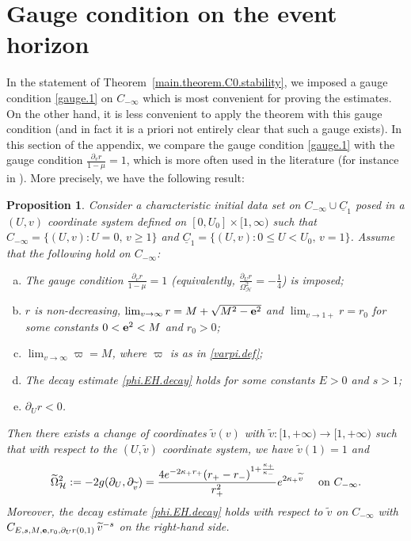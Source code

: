 \documentclass[10pt, reqno]{amsart}
\newtheorem{proposition}[theorem]{Proposition}
\theoremstyle{definition}
\theoremstyle{remark}
\numberwithin{equation}{section}
\newcommand{\set}[1]{\{#1\}}
\newcommand{\rd}{\partial}
\newcommand{\0}{\emptyset}
\newcommand{\Omg}{\Omega}
\newcommand{\bfe}{{\bf e}}
\newcommand{\f}{\frac}
\newcommand{\e}{\bfe}							%
\begin{document}
\section{Gauge condition on the event horizon}\label{sec:appendix.gauge}
In the statement of Theorem~\ref{main.theorem.C0.stability}, we imposed a gauge condition \eqref{gauge.1} on $C_{-\infty}$ which is most convenient for proving the estimates. On the other hand, it is less convenient to apply the theorem with this gauge condition (and in fact it is a priori not entirely clear that such a gauge exists). In this section of the appendix, we compare the gauge condition \eqref{gauge.1} with the gauge condition $\f{\rd_v r}{1-\mu}=1$, which is more often used in the literature (for instance in \cite{DRPL}). More precisely, we have the following result:

\begin{proposition} \label{prop:gauge}
Consider a characteristic initial data set on $C_{-\infty} \cup \underline{C}_{1}$ posed in a $(U,v)$ coordinate system defined on $[0, U_{0}] \times [1, \infty)$ such that $C_{-\infty}= \set{(U, v) : U = 0, \, v \geq 1}$ and $\underline{C}_{1} = \set{(U, v) : 0 \leq U < U_{0}, \, v = 1}$. Assume that the following hold on $C_{-\infty}$:
\begin{enumerate}[(a)]
\item The gauge condition $\f{\rd_v r}{1-\mu}=1$ (equivalently, $\f{\rd_U r}{\Omg^2_{\mathcal H}}=-\f 14$) is imposed;
\item $r$ is non-decreasing, $\lim_{v \to \infty} r = M +\sqrt{M^2-{\bf e}^2}$ and $\lim_{v \to 1+} r = r_{0}$ for some constants $0 < \e^{2} < M$ and $r_{0} > 0$;
\item $\lim_{v \to \infty} \varpi = M$, where $\varpi$ is as in \eqref{varpi.def};
\item The decay estimate \eqref{phi.EH.decay} holds for some constants $E > 0$ and $s > 1$;
\item $\rd_{U} r < 0$.
\end{enumerate}
Then there exists a change of coordinates $\widetilde{v}(v)$ with $\widetilde{v}:[1,+\infty) \to [1,+\infty)$ such that with respect to the $(U,\widetilde{v})$ coordinate system, we have $\widetilde{v}(1) = 1$ and
\begin{equation} \label{eq:gauge-v}
\widetilde{\Omg}^2_{\mathcal H}:= -2 g(\rd_{U}, \rd_{\widetilde{v}})=\f{4e^{-2\kappa_+ r_+}(r_+-r_-)^{1+\f{\kappa_+}{\kappa_-}}}{r_+^2}e^{2\kappa_+ \widetilde{v}} \quad \hbox{ on } C_{-\infty}.
\end{equation}
Moreover, the decay estimate \eqref{phi.EH.decay} holds with respect to $\widetilde{v}$ on $C_{-\infty}$ with $C_{E, s, M, \bfe, r_{0}, \rd_{U} r(0, 1)} \, \widetilde{v}^{-s}$ on the right-hand side.
\end{proposition}
\end{document}
